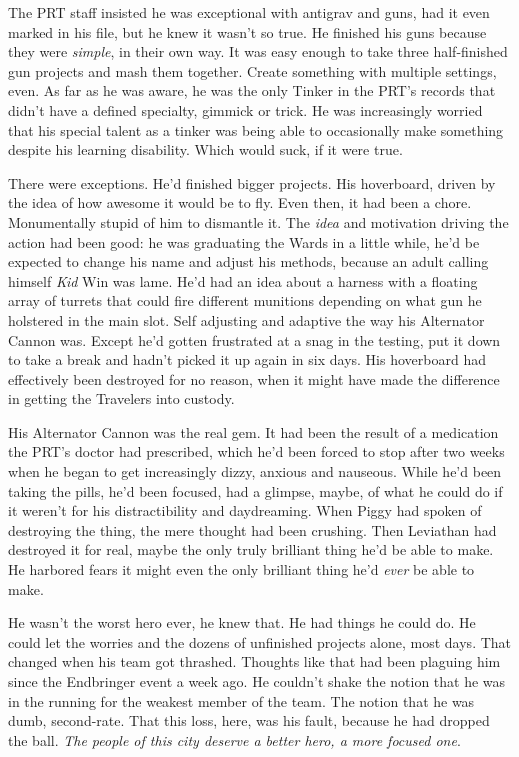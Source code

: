 The PRT staff insisted he was exceptional with antigrav and guns, had it even marked in his file, but he knew it wasn't so true.  He finished his guns because they were \emph{simple}, in their own way.  It was easy enough to take three half-finished gun projects and mash them together.  Create something with multiple settings, even.  As far as he was aware, he was the only Tinker in the PRT's records that didn't have a defined specialty, gimmick or trick.  He was increasingly worried that his special talent as a tinker was being able to occasionally make something despite his learning disability.  Which would suck, if it were true.



There were exceptions.  He'd finished bigger projects.  His hoverboard, driven by the idea of how awesome it would be to fly.  Even then, it had been a chore.  Monumentally stupid of him to dismantle it.  The \emph{idea} and motivation driving the action had been good: he was graduating the Wards in a little while, he'd be expected to change his name and adjust his methods, because an adult calling himself \emph{Kid} Win was lame.  He'd had an idea about a harness with a floating array of turrets that could fire different munitions depending on what gun he holstered in the main slot.  Self adjusting and adaptive the way his Alternator Cannon was.  Except he'd gotten frustrated at a snag in the testing, put it down to take a break and hadn't picked it up again in six days.  His hoverboard had effectively been destroyed for no reason, when it might have made the difference in getting the Travelers into custody.



His Alternator Cannon was the real gem.  It had been the result of a medication the PRT's doctor had prescribed, which he'd been forced to stop after two weeks when he began to get increasingly dizzy, anxious and nauseous.  While he'd been taking the pills, he'd been focused, had a glimpse, maybe, of what he could do if it weren't for his distractibility and daydreaming.  When Piggy had spoken of destroying the thing, the mere thought had been crushing.  Then Leviathan had destroyed it for real, maybe the only truly brilliant thing he'd be able to make.  He harbored fears it might even the only brilliant thing he'd \emph{ever} be able to make.



He wasn't the worst hero ever, he knew that.  He had things he could do.  He could let the worries and the dozens of unfinished projects alone, most days.  That changed when his team got thrashed.  Thoughts like that had been plaguing him since the Endbringer event a week ago.  He couldn't shake the notion that he was in the running for the weakest member of the team.  The notion that he was dumb, second-rate.  That this loss, here, was his fault, because he had dropped the ball. \emph{ The people of this city deserve a better hero, a more focused one}.



